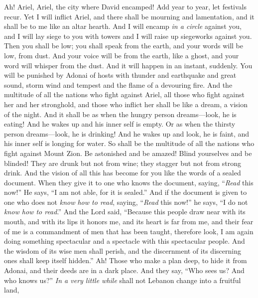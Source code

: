 \begin{biblechapter} %
 Ah! Ariel, Ariel, the city where David encamped!
\verse Add year to year, 
let festivals recur.
\verse Yet I will inflict Ariel, 
and there shall be mourning and lamentation, 
and it shall be to me like an altar hearth.
\verse And I will encamp \textit{in a circle} against you, 
and I will lay siege to you with towers 
and I will raise up siegeworks against you.
\verse Then you shall be low; 
you shall speak from the earth, 
and your words will be low, from dust. 
And your voice will be from the earth, like a ghost, 
and your word will whisper from the dust. And it will happen in an instant, suddenly.
\verse You will be punished by Adonai of hosts
\verse with thunder and earthquake and great sound, 
storm wind and tempest and the flame of a devouring fire.
\verse And the multitude of all the nations who fight against Ariel, 
all those who fight against her and her stronghold, 
and those who inflict her shall be like a dream, a vision of the night.
\verse And it shall be as when the hungry person dreams—look, he is eating! 
And he wakes up and his inner self is empty. 
Or as when the thirsty person dreams—look, he is drinking! 
And he wakes up and look, he is faint, 
and his inner self is longing for water. 
So shall be the multitude of all the nations who fight against Mount Zion.
\verse Be astonished and be amazed! 
Blind yourselves and be blinded! 
They are drunk but not from wine; 
they stagger but not from strong drink.
\verse And the vision of all this has become for you like the words of a sealed document. When they give it to one who knows the document, saying, “\textit{Read} this now!” He says, “I am not able, for it is sealed.”
\verse And if the document is given to one who does not \textit{know how to read}, saying, “\textit{Read} this now!” he says, “I do not \textit{know how to read}.”
\verse And the Lord said, “Because this people draw near with its mouth, 
and with its lips it honors me, 
and its heart is far from me, 
and their fear of me is a commandment of men that has been taught,
\verse therefore look, I am again doing something spectacular
\verse and a spectacle with this spectacular people. 
And the wisdom of its wise men shall perish, 
and the discernment of its discerning ones shall keep itself hidden.”
\verse Ah! Those who make a plan deep, to hide it from Adonai, 
and their deeds are in a dark place. 
And they say, “Who sees us? 
And who knows us?”
 \textit{In a very little while} shall not Lebanon change into a fruitful land, 

\end{biblechapter}
